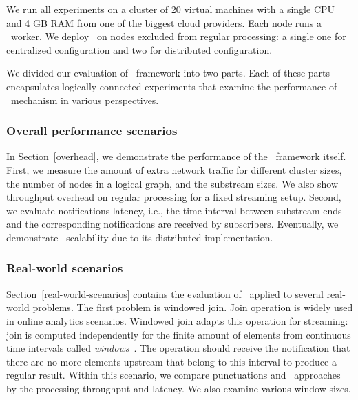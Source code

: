 We run all experiments on a cluster of 20 virtual machines with a single CPU and 4 GB RAM from one of the biggest cloud providers. Each node runs a \FlameStream\ worker. We deploy \tracker\ on nodes excluded from regular processing: a single one for centralized configuration and two for distributed configuration. 

We divided our evaluation of \tracker\ framework into two parts. Each of these parts encapsulates logically connected experiments that examine the performance of \tracker\ mechanism in various perspectives.

\subsubsection{Overall performance scenarios}


In Section~\ref{overhead}, we demonstrate the performance of the \tracker\ framework itself. First, we measure the amount of extra network traffic for different cluster sizes, the number of nodes in a logical graph, and the substream sizes. We also show throughput overhead on regular processing for a fixed streaming setup. Second, we evaluate notifications latency, i.e., the time interval between substream ends and the corresponding notifications are received by subscribers.  Eventually, we demonstrate \tracker\ scalability due to its distributed implementation. 

\subsubsection{Real-world scenarios}


Section~\ref{real-world-scenarios} contains the evaluation of \tracker\ applied to several real-world problems. The first problem is windowed join. Join operation is widely used in online analytics scenarios. Windowed join adapts this operation for streaming: join is computed independently for the finite amount of elements from continuous time intervals called {\em windows}~\cite{Begoli:2019:OSR:3299869.3314040}. The operation should receive the notification that there are no more elements upstream that belong to this interval to produce a regular result. Within this scenario, we compare punctuations and \tracker\ approaches by the processing throughput and latency. We also examine various window sizes.

